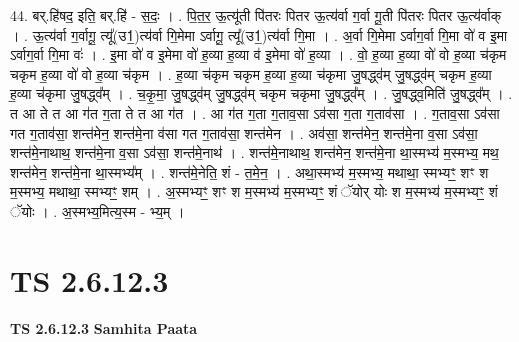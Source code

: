 \documentclass[17pt]{extarticle}
\begin{document}
44. बर्.हि॑षद॒ इति॒ बर्.हि॑ - स॒दः॒ । . पि॒त॒र॒ ऊ॒त्यू॑ती पि॑तरः पितर ऊ॒त्य॑र्वा ग॒र्वा गू॒ती पि॑तरः पितर ऊ॒त्य॑र्वाक् । . ऊ॒त्य॑र्वा ग॒र्वागू॒ त्यू᳚(उ1॒)त्य॑र्वा गि॒मेमा ऽर्वागू॒ त्यू᳚(उ1॒)त्य॑र्वा गि॒मा । . अ॒र्वा गि॒मेमा ऽर्वाग॒र्वा गि॒मा वो॑ व इ॒मा ऽर्वाग॒र्वा गि॒मा वः॑ । . इ॒मा वो॑ व इ॒मेमा वो॑ ह॒व्या ह॒व्या व॑ इ॒मेमा वो॑ ह॒व्या । . वो॒ ह॒व्या ह॒व्या वो॑ वो ह॒व्या च॑कृम चकृम ह॒व्या वो॑ वो ह॒व्या च॑कृम । . ह॒व्या च॑कृम चकृम ह॒व्या ह॒व्या च॑कृमा जु॒षद्ध्व॑म् जु॒षद्ध्व॑म् चकृम ह॒व्या ह॒व्या च॑कृमा जु॒षद्ध्व᳚म् । . च॒कृ॒मा॒ जु॒षद्ध्व॑म् जु॒षद्ध्व॑म् चकृम चकृमा जु॒षद्ध्व᳚म् । . जु॒षद्ध्व॒मिति॑ जु॒षद्ध्व᳚म् । . त आ ते त आ ग॑त ग॒ता ते त आ ग॑त । . आ ग॑त ग॒ता ग॒ताव॒सा ऽव॑सा ग॒ता ग॒ताव॑सा । . ग॒ताव॒सा ऽव॑सा गत ग॒ताव॑सा॒ शन्त॑मेन॒ शन्त॑मे॒ना व॑सा गत ग॒ताव॑सा॒ शन्त॑मेन । . अव॑सा॒ शन्त॑मेन॒ शन्त॑मे॒ना व॒सा ऽव॑सा॒ शन्त॑मे॒नाथाथ॒ शन्त॑मे॒ना व॒सा ऽव॑सा॒ शन्त॑मे॒नाथ॑ । . शन्त॑मे॒नाथाथ॒ शन्त॑मेन॒ शन्त॑मे॒ना था॒स्मभ्य॑ म॒स्मभ्य॒ मथ॒ शन्त॑मेन॒ शन्त॑मे॒ना था॒स्मभ्य᳚म् । . शन्त॑मे॒नेति॒ शं - त॒मे॒न॒ । . अथा॒स्मभ्य॑ म॒स्मभ्य॒ मथाथा॒ स्मभ्यꣳ॒॒ शꣳ श म॒स्मभ्य॒ मथाथा॒ स्मभ्यꣳ॒॒ शम् । . अ॒स्मभ्यꣳ॒॒ शꣳ श म॒स्मभ्य॑ म॒स्मभ्यꣳ॒॒ शं ॅयोर् योः श म॒स्मभ्य॑ म॒स्मभ्यꣳ॒॒ शं ॅयोः । . अ॒स्मभ्य॒मित्य॒स्म - भ्य॒म् । \newline
\pagebreak
{}
\section*{ TS 2.6.12.3 }

\textbf{TS 2.6.12.3 } \newline
\textbf{Samhita Paata} \newline
\end{document}
